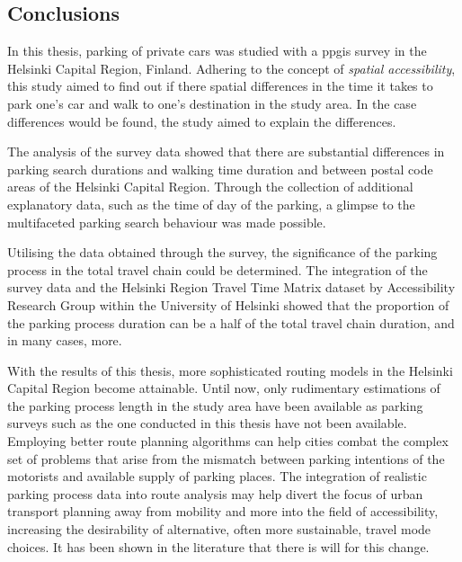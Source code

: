 \newpage
\subsection{Conclusions}
\justify

In this thesis, parking of private cars was studied with a \acrfull{ppgis} survey in the Helsinki Capital Region, Finland. Adhering to the concept of \textit{spatial accessibility}, this study aimed to find out if there spatial differences in the time it takes to park one's car and walk to one's destination in the study area. In the case differences would be found, the study aimed to explain the differences.

The analysis of the survey data showed that there are substantial differences in parking search durations and walking time duration and between postal code areas of the Helsinki Capital Region. Through the collection of additional explanatory data, such as the time of day of the parking, a glimpse to the multifaceted parking search behaviour was made possible.

Utilising the data obtained through the survey, the significance of the parking process in the total travel chain could be determined. The integration of the survey data and the Helsinki Region Travel Time Matrix dataset by Accessibility Research Group within the University of Helsinki showed that the proportion of the parking process duration can be a half of the total travel chain duration, and in many cases, more.

With the results of this thesis, more sophisticated routing models in the Helsinki Capital Region become attainable. Until now, only rudimentary estimations of the parking process length in the study area have been available as parking surveys such as the one conducted in this thesis have not been available. Employing better route planning algorithms can help cities combat the complex set of problems that arise from the mismatch between parking intentions of the motorists and available supply of parking places. The integration of realistic parking process data into route analysis may help divert the focus of urban transport planning away from mobility and more into the field of accessibility, increasing the desirability of alternative, often more sustainable, travel mode choices. It has been shown in the literature that there is will for this change.

